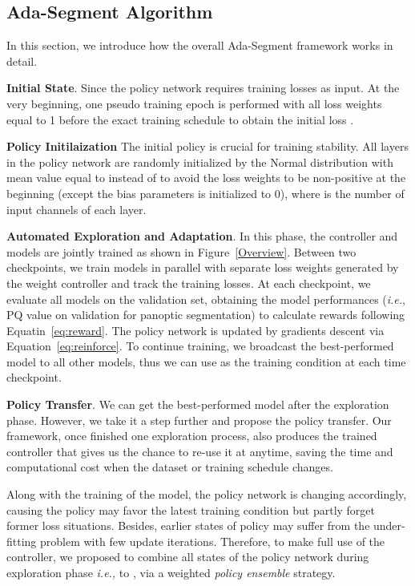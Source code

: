 \documentclass[letterpaper]{article} \usepackage{aaai21}  \usepackage{times}  \usepackage{helvet} \usepackage{courier}  \usepackage[hyphens]{url}  \usepackage{graphicx} \urlstyle{rm} \def\UrlFont{\rm}  \usepackage{natbib}  \usepackage{caption} \frenchspacing  \setlength{\pdfpagewidth}{8.5in}  \setlength{\pdfpageheight}{11in}
\begin{document}
 \subsection{Ada-Segment Algorithm} 
 \label{sec:ada-segment-alg}
 In this section, we introduce how the overall Ada-Segment framework works in detail. 

 \noindent
 \textbf{Initial State}. 
 Since the policy network requires training losses as input. At the very beginning, 
 one pseudo training epoch is performed with all loss weights equal to 1 before the exact training schedule
 to obtain the initial loss . 

 \noindent
 \textbf{Policy Initilaization} The initial policy is crucial for training stability. 
 All layers in the policy network are randomly initialized 
 by the Normal distribution with mean value equal to  instead of  to avoid the loss weights 
 to be non-positive at the beginning (except the bias parameters is initialized to 0), 
 where  is the number of input channels of each layer.

 \noindent
 \textbf{Automated Exploration and Adaptation}.
 In this phase, the controller and  models are jointly trained as shown in Figure~\ref{Overview}. 
 Between two checkpoints, we train models in parallel with 
 separate loss weights generated by the weight controller and track the training losses. 
 At each checkpoint, we evaluate all models on the validation set,
 obtaining the model performances  (\textit{i.e.}, PQ value on validation for panoptic segmentation)
 to calculate rewards following Equatin~\ref{eq:reward}.
 The policy network is  
 updated by gradients descent via Equation~\ref{eq:reinforce}. 
To continue training, 
 we broadcast the best-performed model to all other models,
 thus we can use  as the training condition at each time checkpoint. 

 \noindent
 \textbf{Policy Transfer}.
We can get the best-performed model  after the exploration phase. 
 However, we take it a step further and propose the policy transfer. 
 Our framework, once finished one exploration 
 process, also produces the trained controller that 
gives us the chance to re-use it at anytime,
 saving the time and computational cost when the dataset or training schedule changes.
 
 Along with the training of the model, the policy network is changing accordingly, causing the 
 policy  may favor the latest training condition but partly forget former loss situations. 
 Besides, earlier states of policy may suffer from the under-fitting problem with few update iterations. 
Therefore, to make full use of the controller, 
 we proposed to combine all states of the policy network during exploration phase 
 \textit{i.e., } to , via a weighted
 \textit{policy ensemble} strategy.
\end{document}
